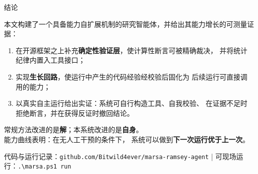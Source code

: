 \documentclass[aspectratio=169,11pt]{beamer}
\newcommand{\code}[1]{\texttt{\small #1}}
\newcommand{\key}[1]{\textbf{\color{accent}#1}}
\begin{document}
\begin{frame}{结论}
  \begin{block}{}
    \normalsize
    本文构建了一个具备能力自扩展机制的研究智能体，并给出其能力增长的可测量证据：
    \begin{enumerate}
      \item 在开源框架之上补充\textbf{确定性验证层}，使计算性断言可被精确裁决，
        并将统计纪律内置入工具接口；
      \item 实现\textbf{生长回路}，使运行中产生的代码经验经校验后固化为
        后续运行可直接调用的能力；
      \item 以真实自主运行给出实证：系统可自行构造工具、自我校验、
        在证据不足时拒绝断言，并在获得反证时撤回结论。
    \end{enumerate}
  \end{block}

  \vspace{0.5em}
  \begin{block}{}
    \normalsize
    \centering
    常规方法改进的是\key{解}；本系统改进的是\key{自身}。\\[0.3em]
    能力曲线表明：在无人工干预的条件下，
    系统可以做到\key{下一次运行优于上一次}。
  \end{block}

  \vspace{0.3em}
  \footnotesize\color{black!60}
  代码与运行记录：\texttt{github.com/Bitwild4ever/marsa-ramsey-agent}
  \quad|\quad
  可现场运行：\code{.\textbackslash marsa.ps1 run}
\end{frame}
\end{document}

